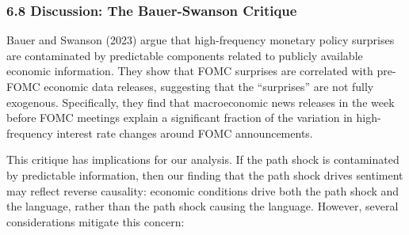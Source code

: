 \documentclass[12pt]{article}
\begin{document}
\subsubsection{6.8 Discussion: The Bauer-Swanson
Critique}\label{discussion-the-bauer-swanson-critique}

Bauer and Swanson (2023) argue that high-frequency monetary policy
surprises are contaminated by predictable components related to publicly
available economic information. They show that FOMC surprises are
correlated with pre-FOMC economic data releases, suggesting that the
``surprises'' are not fully exogenous. Specifically, they find that
macroeconomic news releases in the week before FOMC meetings explain a
significant fraction of the variation in high-frequency interest rate
changes around FOMC announcements.

This critique has implications for our analysis. If the path shock is
contaminated by predictable information, then our finding that the path
shock drives sentiment may reflect reverse causality: economic
conditions drive both the path shock and the language, rather than the
path shock causing the language. However, several considerations
mitigate this concern:
\end{document}
